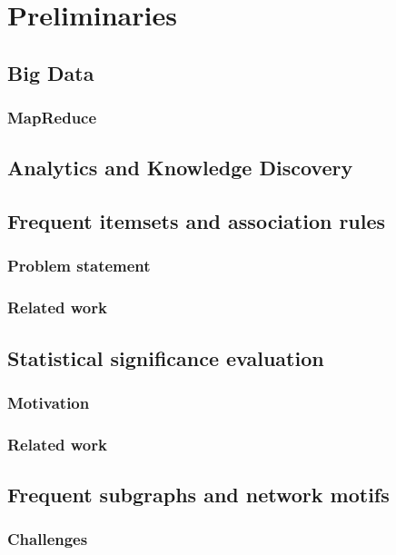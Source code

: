 \chapter{Preliminaries}\label{ch:prelims}

\section{Big Data}

\subsection{MapReduce}

\section{Analytics and Knowledge Discovery}

\section{Frequent itemsets and association rules}

\subsection{Problem statement}
\subsection{Related work}

\section{Statistical significance evaluation}
\subsection{Motivation}
\subsection{Related work}

\section{Frequent subgraphs and network motifs}
\subsection{Challenges}
